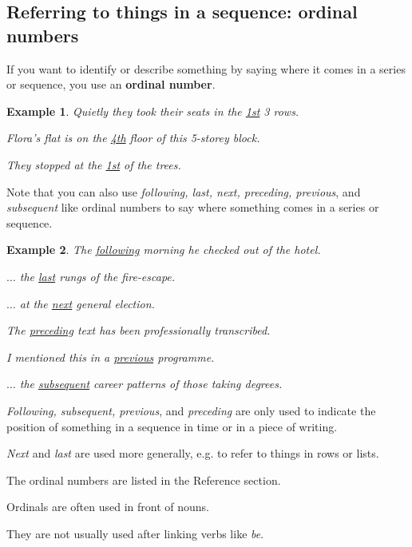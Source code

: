 \documentclass[oneside]{book}
\numberwithin{equation}{section}
\newtheorem{example}{Example}[section]
\begin{document}
\subsection{Referring to things in a sequence: ordinal numbers}
\noindent{} If you want to identify or describe something by saying where it comes in a series or sequence, you use an \textbf{ordinal number}.
\begin{example}
    Quietly they took their seats in the \underline{1st} 3 rows.
    
    Flora's flat is on the \underline{4th} floor of this 5-storey block.
    
    They stopped at the \underline{1st} of the trees.
\end{example}
Note that you can also use \textit{following, last, next, preceding, previous}, and \textit{subsequent} like ordinal numbers to say where something comes in a series or sequence.
\begin{example}
    The \underline{following} morning he checked out of the hotel.
    
    $\ldots$ the \underline{last} rungs of the fire-escape.
    
    $\ldots$ at the \underline{next} general election.
    
    The \underline{preceding} text has been professionally transcribed.
    
    I mentioned this in a \underline{previous} programme.
    
    $\ldots$ the \underline{subsequent} career patterns of those taking degrees.
\end{example}
\textit{Following, subsequent, previous}, and \textit{preceding} are only used to indicate the position of something in a sequence in time or in a piece of writing.

\textit{Next} and \textit{last} are used more generally, e.g. to refer to things in rows or lists.

%
The ordinal numbers are listed in the Reference section.

%
\noindent{} Ordinals are often used in front of nouns.

They are not usually used after linking verbs like \textit{be}.
\end{document}
